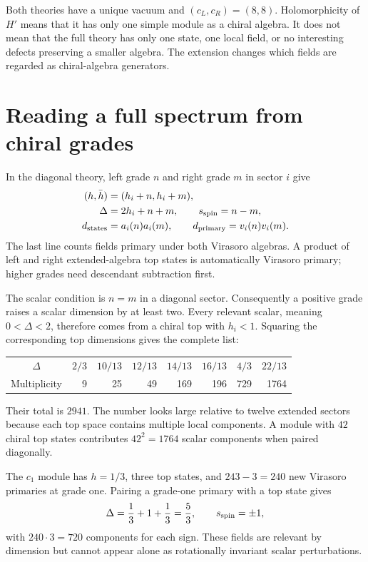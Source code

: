 Both theories have a unique vacuum and $(c_L,c_R)=(8,8)$.
Holomorphicity of $H'$ means that it has only one simple module
as a chiral algebra. It does not mean that the full theory has
only one state, one local field, or no interesting defects
preserving a smaller algebra. The extension changes which fields
are regarded as chiral-algebra generators.

\section{Reading a full spectrum from chiral grades}

In the diagonal theory, left grade $n$ and right grade $m$ in
sector $i$ give
\begin{equation}
 \begin{split}
 (h,\bar h)&=(h_i+n,h_i+m),\\
 \Delta&=2h_i+n+m,\qquad s_{\rm spin}=n-m,\\
 d_{\rm states}&=a_i(n)a_i(m),\qquad
 d_{\rm primary}=v_i(n)v_i(m).
 \end{split}
 \label{eq:full-grade-count}
\end{equation}
The last line counts fields primary under both Virasoro algebras.
A product of left and right extended-algebra top states is
automatically Virasoro primary; higher grades need descendant
subtraction first.

The scalar condition is $n=m$ in a diagonal sector. Consequently a
positive grade raises a scalar dimension by at least two. Every
relevant scalar, meaning $0<\Delta<2$, therefore comes from a
chiral top with $h_i<1$. Squaring the corresponding top dimensions
gives the complete list:
\begin{center}
\begin{tabular}{c|rrrrrrr}
\toprule
$\Delta$&$2/3$&$10/13$&$12/13$&$14/13$&$16/13$&$4/3$&$22/13$\\
Multiplicity&9&25&49&169&196&729&1764\\
\bottomrule
\end{tabular}
\end{center}
Their total is $2941$. The number looks large relative to twelve
extended sectors because each top space contains multiple local
components. A module with $42$ chiral top states contributes
$42^2=1764$ scalar components when paired diagonally.

\begin{example}
The $c_1$ module has $h=1/3$, three top states, and
$243-3=240$ new Virasoro primaries at grade one. Pairing a grade-one
primary with a top state gives
\[
 \Delta=\frac13+1+\frac13=\frac53,
 \qquad s_{\rm spin}=\pm1,
\]
with $240\cdot3=720$ components for each sign. These fields are
relevant by dimension but cannot appear alone as rotationally
invariant scalar perturbations.
\end{example}

